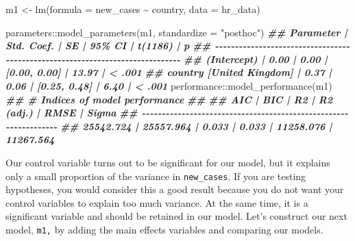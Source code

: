 \documentclass[
]{book}
\newenvironment{Shaded}{\begin{snugshade}}{\end{snugshade}}
\newcommand{\AttributeTok}[1]{\textcolor[rgb]{0.77,0.63,0.00}{#1}}
\newcommand{\DocumentationTok}[1]{\textcolor[rgb]{0.56,0.35,0.01}{\textbf{\textit{#1}}}}
\newcommand{\FunctionTok}[1]{\textcolor[rgb]{0.00,0.00,0.00}{#1}}
\newcommand{\NormalTok}[1]{#1}
\newcommand{\OtherTok}[1]{\textcolor[rgb]{0.56,0.35,0.01}{#1}}
\newcommand{\SpecialCharTok}[1]{\textcolor[rgb]{0.00,0.00,0.00}{#1}}
\newcommand{\StringTok}[1]{\textcolor[rgb]{0.31,0.60,0.02}{#1}}
\begin{document}
\begin{Shaded}
\begin{Highlighting}[]
\NormalTok{m1 }\OtherTok{\textless{}{-}} \FunctionTok{lm}\NormalTok{(}\AttributeTok{formula =}\NormalTok{ new\_cases }\SpecialCharTok{\textasciitilde{}}\NormalTok{ country,}
         \AttributeTok{data =}\NormalTok{ hr\_data)}

\NormalTok{parameters}\SpecialCharTok{::}\FunctionTok{model\_parameters}\NormalTok{(m1, }\AttributeTok{standardize =} \StringTok{"posthoc"}\NormalTok{)}
\DocumentationTok{\#\# Parameter                | Std. Coef. |   SE |       95\% CI | t(1186) |      p}
\DocumentationTok{\#\# {-}{-}{-}{-}{-}{-}{-}{-}{-}{-}{-}{-}{-}{-}{-}{-}{-}{-}{-}{-}{-}{-}{-}{-}{-}{-}{-}{-}{-}{-}{-}{-}{-}{-}{-}{-}{-}{-}{-}{-}{-}{-}{-}{-}{-}{-}{-}{-}{-}{-}{-}{-}{-}{-}{-}{-}{-}{-}{-}{-}{-}{-}{-}{-}{-}{-}{-}{-}{-}{-}{-}{-}{-}{-}{-}{-}{-}{-}}
\DocumentationTok{\#\# (Intercept)              |       0.00 | 0.00 | [0.00, 0.00] |   13.97 | \textless{} .001}
\DocumentationTok{\#\# country [United Kingdom] |       0.37 | 0.06 | [0.25, 0.48] |    6.40 | \textless{} .001}
\NormalTok{performance}\SpecialCharTok{::}\FunctionTok{model\_performance}\NormalTok{(m1)}
\DocumentationTok{\#\# \# Indices of model performance}
\DocumentationTok{\#\# }
\DocumentationTok{\#\# AIC       |       BIC |    R2 | R2 (adj.) |      RMSE |     Sigma}
\DocumentationTok{\#\# {-}{-}{-}{-}{-}{-}{-}{-}{-}{-}{-}{-}{-}{-}{-}{-}{-}{-}{-}{-}{-}{-}{-}{-}{-}{-}{-}{-}{-}{-}{-}{-}{-}{-}{-}{-}{-}{-}{-}{-}{-}{-}{-}{-}{-}{-}{-}{-}{-}{-}{-}{-}{-}{-}{-}{-}{-}{-}{-}{-}{-}{-}{-}{-}{-}}
\DocumentationTok{\#\# 25542.724 | 25557.964 | 0.033 |     0.033 | 11258.076 | 11267.564}
\end{Highlighting}
\end{Shaded}

Our control variable turns out to be significant for our model, but it explains only a small proportion of the variance in \texttt{new\_cases}. If you are testing hypotheses, you would consider this a good result because you do not want your control variables to explain too much variance. At the same time, it is a significant variable and should be retained in our model. Let's construct our next model, \texttt{m1,} by adding the main effects variables and comparing our models.
\end{document}
